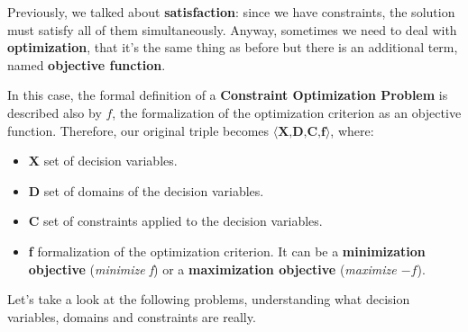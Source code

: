 Previously, we talked about \textbf{satisfaction}: since we have constraints, the solution must satisfy all of them simultaneously. Anyway,
sometimes we need to deal with \textbf{optimization}, that it's the same thing as before but there is an additional term, named \textbf{objective function}. \vspace{7pt}

In this case, the formal definition of a \textbf{Constraint Optimization Problem} is described also by $f$, the formalization of the optimization 
criterion as an objective function. Therefore, our original triple becomes $\langle \textbf{X,D,C,f} \rangle$, where:
\begin{itemize}
    \renewcommand{\labelitemi}{-}
    \item \textbf{X} set of decision variables.
    \item \textbf{D} set of domains of the decision variables.
    \item \textbf{C} set of constraints applied to the decision variables.
    \item \textbf{f} formalization of the optimization criterion. It can be a \textbf{minimization objective} (\textit{minimize f}) or a \textbf{maximization objective} (\textit{maximize $-f$}).
\end{itemize}
Let's take a look at the following problems, understanding what decision variables, domains and constraints are really.
